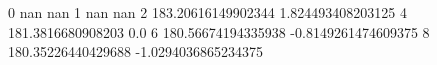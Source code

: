 0 nan nan
1 nan nan
2 183.20616149902344 1.824493408203125
4 181.3816680908203 0.0
6 180.56674194335938 -0.8149261474609375
8 180.35226440429688 -1.0294036865234375
